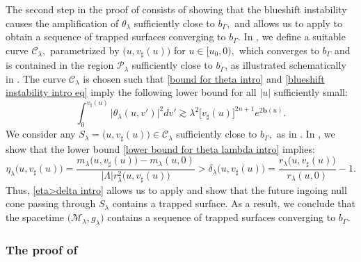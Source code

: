 \documentclass[11pt]{article}
\numberwithin{equation}{section}
\begin{document}
The second step in the proof of  consists of showing that the blueshift instability causes the amplification of $\theta_{\lambda}$ sufficiently close to $b_{\Gamma},$ and allows us to apply  to obtain a sequence of trapped surfaces converging to $b_{\Gamma}.$ In , we define a suitable curve $\mathcal{C}_{\lambda},$ parametrized by $\big(u,v_{\sharp}(u)\big)$ for $u\in[u_0,0),$ which converges to $b_{\Gamma}$ and is contained in the region $\mathcal{P}_{\lambda}$ sufficiently close to $b_{\Gamma}$, as illustrated schematically in . The curve $\mathcal{C}_{\lambda}$ is chosen such that \eqref{bound for theta intro} and \eqref{blueshift instability intro eq} imply the following lower bound for all $|u|$ sufficiently small:
\begin{equation}\label{lower bound for theta lambda intro}
        \int_0^{v_{\sharp}(u)}\big|\theta_{\lambda}(u,v')\big|^2dv'\gtrsim\lambda^2\big[v_{\sharp}(u)\big]^{2n+1}e^{2\mathbf{b}(u)}.
\end{equation}
We consider any $S_{\lambda}=\big(u,v_{\sharp}(u)\big)\in\mathcal{C}_{\lambda}$ sufficiently close to $b_{\Gamma},$ as in . In , we show that the lower bound \eqref{lower bound for theta lambda intro} implies:
\begin{equation}\label{eta>delta intro}
    \eta_{\lambda}\big(u,v_{\sharp}(u)\big)=\frac{m_{\lambda}\big(u,v_{\sharp}(u)\big)-m_{\lambda}(u,0)}{|\Lambda|r_{\lambda}^2\big(u,v_{\sharp}(u)\big)}>\delta_{\lambda}\big(u,v_{\sharp}(u)\big)=\frac{r_{\lambda}\big(u,v_{\sharp}(u)\big)}{r_{\lambda}(u,0)}-1.
\end{equation}
Thus, \eqref{eta>delta intro} allows us to apply  and show that the future ingoing null cone passing through $S_{\lambda}$ contains a trapped surface. As a result, we conclude that the spacetime $\big(\mathcal{M}_{\lambda},g_{\lambda}\big)$ contains a sequence of trapped surfaces converging to $b_{\Gamma}$.

\subsubsection{The proof of }\label{proof of main thm section intro}
\end{document}

